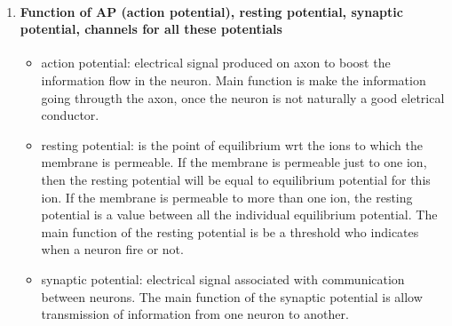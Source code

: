\documentclass[12pt,article,oneside,a4paper]{memoir}
\begin{document}
\begin{enumerate}
\item \paragraph{Function of AP (action potential), resting potential, synaptic potential, channels for all these potentials}

\begin{itemize}
\item action potential: electrical signal produced on axon to boost the information flow in the neuron.	Main function is make the information going througth the axon, once the neuron is not naturally a good eletrical conductor.
\item resting potential: is the point of equilibrium wrt the ions to which the membrane is permeable. If the membrane is permeable just to one ion, then the resting potential will be equal to equilibrium potential for this ion. If the membrane is permeable to more than one ion, the resting potential is a value between all the individual equilibrium potential. The main function of the resting potential is be a threshold who indicates when a neuron fire or not.
\item synaptic potential: electrical signal associated with communication between neurons. The main function of the synaptic potential is allow transmission of information from one neuron to another.
\end{itemize}


\end{enumerate}
\end{document}
